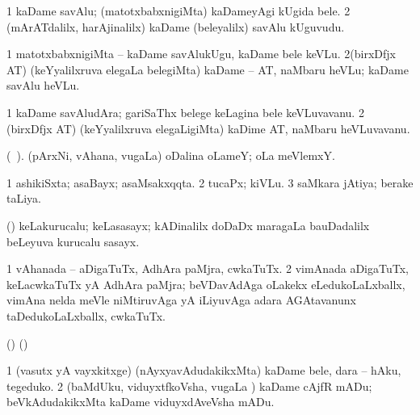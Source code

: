{\bentry
{} 
\gl{\nA}
\expl{}
\bmng
\bnum
\num{1} kaDame savAlu; (matotxbabxnigiMta) kaDameyAgi kUgida bele. 
\num{2} (mArATdalilx, harAjinalilx) kaDame (beleyalilx) savAlu kUguvudu. 
\enum
\emng
\eentry

\bentry
{} 
\gl{\sakirx}
\bmng
\bnum
\num{1} matotxbabxnigiMta -- kaDame savAlukUgu, kaDame bele keVLu. 
\num{2}(birxDfjx AT) (keYyalilxruva elegaLa belegiMta) kaDame -- AT, naMbaru heVLu; kaDame savAlu heVLu. 
\enum
\emng
\eentry

\bentry
{} 
\gl{\nA}
\expl{}
\bmng
\bnum
\num{1} kaDame savAludAra; gariSaThx belege keLagina bele keVLuvavanu. 
\num{2} (birxDfjx AT) (keYyalilxruva elegaLigiMta) kaDime AT, naMbaru heVLuvavanu. 
\enum
\emng
\eentry

\bentry
{} 
\gl{\nA}
\expl{}
\bmng
 (\bava\ ). (pArxNi, vAhana, \mo vugaLa) oDalina oLameY; oLa meVlemxY. 
\emng
\eentry

\bentry
{} 
\gl{\gu}
\expl{}
\bmng
\bnum
\num{1} ashikiSxta; asaBayx; asaMsakxqqta. 
\num{2} tucaPx; kiVLu. 
\num{3} saMkara jAtiya; berake taLiya. 
\enum
\emng
\eentry

\bentry
{} 
\gl{\nA}
\expl{}
\bmng
 (\ame) keLakurucalu; keLasasayx; kADinalilx doDaDx maragaLa bauDadalilx beLeyuva kurucalu sasayx. 
\emng
\eentry

\bentry
{} 
\gl{\nA}
\expl{}
\bmng
\bnum
\num{1} vAhanada -- aDigaTuTx, AdhAra paMjra, cwkaTuTx. 
\hypertarget{undercarriage(2)}{} 
\num{2} vimAnada aDigaTuTx, keLacwkaTuTx yA AdhAra paMjra; beVDavAdAga oLakekx eLedukoLaLxballx, vimAna nelda meVle niMtiruvAga yA iLiyuvAga adara AGAtavanunx taDedukoLaLxballx, cwkaTuTx. 
\enum
\emng
\eentry

\bentry
{} 
\gl{\nA}
\expl{}
\bmng
 (\birx) (\AmA)  
\emng
\eentry

\bentry
{} 
\gl{\sakirx}
\expl{}
\bmng
\bnum
\num{1} (vasutx yA vayxkitxge) (nAyxyavAdudakikxMta) kaDame bele, dara -- hAku, tegeduko. 
\num{2} (baMdUku, viduyxtfkoVsha, \mo vugaLa \vi) kaDame cAjfR mADu; beVkAdudakikxMta kaDame viduyxdAveVsha mADu. 
\enum
\emng
\eentry

}
